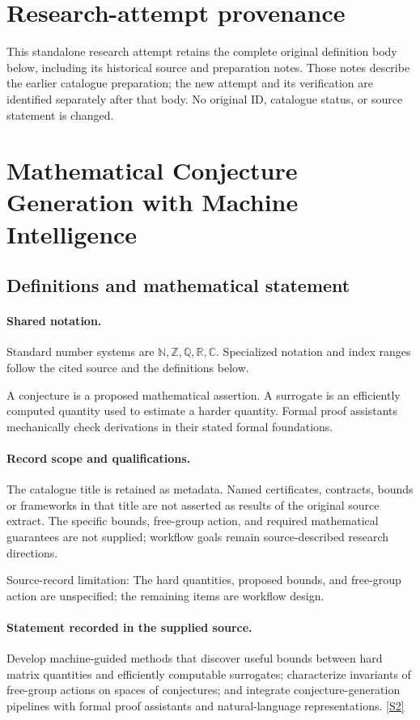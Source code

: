 \documentclass[11pt]{article}
\begin{document}
\section*{Research-attempt provenance}
This standalone research attempt retains the complete original definition body below,
including its historical source and preparation notes. Those notes describe the
earlier catalogue preparation; the new attempt and its verification are identified
separately after that body. No original ID, catalogue status, or source statement is changed.

\section{Mathematical Conjecture Generation with Machine Intelligence}\label{statement}

\subsection{Definitions and mathematical statement}

\paragraph{Shared notation.}Standard number systems are $\mathbb N,\mathbb Z,\mathbb Q,\mathbb R,\mathbb C$. Specialized notation and index ranges follow the cited source and the definitions below.


A conjecture is a proposed mathematical assertion. A surrogate is an efficiently computed quantity used to estimate a harder quantity. Formal proof assistants mechanically check derivations in their stated formal foundations.
\paragraph{Record scope and qualifications.}
The catalogue title is retained as metadata. Named certificates, contracts, bounds or frameworks in that title are not asserted as results of the original source extract.
The specific bounds, free-group action, and required mathematical guarantees are not supplied; workflow goals remain source-described research directions.

Source-record limitation: The hard quantities, proposed bounds, and free-group action are unspecified; the remaining items are workflow design.
\paragraph{Statement recorded in the supplied source.}
Develop machine-guided methods that discover useful bounds between hard matrix quantities and efficiently computable surrogates; characterize invariants of free-group actions on spaces of conjectures; and integrate conjecture-generation pipelines with formal proof assistants and natural-language representations. \href{https://doi.org/10.4171/owr/2023/26}{[S2]}
\end{document}
